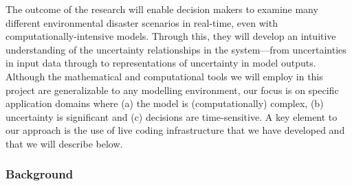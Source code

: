 The outcome of the research will enable decision makers to examine
many different environmental disaster scenarios in real-time, even
with computationally-intensive models. Through this, they will develop
an intuitive understanding of the uncertainty relationships in the
system—from uncertainties in input data through to representations of
uncertainty in model outputs. Although the mathematical and
computational tools we will employ in this project are generalizable
to any modelling environment, our focus is on specific application
domains where (a) the model is (computationally) complex, (b)
uncertainty is significant and (c) decisions are time-sensitive. A key
element to our approach is the use of live coding infrastructure that
we have developed and that we will describe below.

\iffalse
Our vision is that decision makers will be able
to examine many different environmental disaster scenarios in a short
space of time, even with computationally-expensive models. They will 
develop an intuitive understanding of the uncertainty
relationships in the system---from uncertainties in input data through
to representations of uncertainty in model outputs. 
Although the mathematical and computational tools we will employ in
this project are generalisable to any modelling workflow, our focus is
on specific application domains where (a) the model is
(computationally) complex, (b) uncertainty is significant and (c)
decisions are time-sensitive. Specifically, we will build interactive
interfaces for riverine floods, storm surge and tsunami modelling,
which exemplify these characteristics.
\fi


\subsubsection*{Background}

